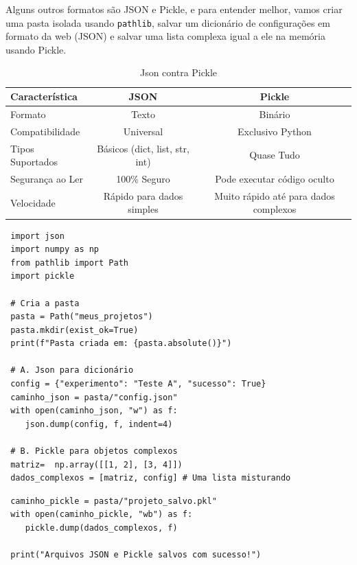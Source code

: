 \documentclass[../numerical_methods.tex]{subfiles}
\begin{document}
Alguns outros formatos são JSON e Pickle, e para entender melhor, vamos criar uma pasta isolada usando \texttt{pathlib}, salvar um dicionário de configurações em formato da web (JSON) e salvar uma lista complexa igual a ele na memória usando Pickle.
\begin{center}
	\begin{table}[H]
		\centering
		\begin{tabular}{l c c}
			\hline
			Característica   & JSON                           & Pickle                                \\
			\hline
			Formato          & Texto                          & Binário                               \\
			Compatibilidade  & Universal                      & Exclusivo Python                      \\
			Tipos Suportados & Básicos (dict, list, str, int) & Quase Tudo                            \\
			Segurança ao Ler & 100\% Seguro                   & Pode executar código oculto           \\
			Velocidade       & Rápido para dados simples      & Muito rápido até para dados complexos \\
			\hline
		\end{tabular}
		\caption{Json contra Pickle}
	\end{table}
\end{center}
\begin{listing}[H]
	\begin{verbatim}
 import json 
 import numpy as np 
 from pathlib import Path 
 import pickle 

 # Cria a pasta 
 pasta = Path("meus_projetos")
 pasta.mkdir(exist_ok=True)
 print(f"Pasta criada em: {pasta.absolute()}")

 # A. Json para dicionário 
 config = {"experimento": "Teste A", "sucesso": True}
 caminho_json = pasta/"config.json"
 with open(caminho_json, "w") as f: 
    json.dump(config, f, indent=4)

 # B. Pickle para objetos complexos 
 matriz=  np.array([[1, 2], [3, 4]])
 dados_complexos = [matriz, config] # Uma lista misturando 
\end{verbatim}
\end{listing}

\begin{listing}[H]
	\begin{verbatim}
 caminho_pickle = pasta/"projeto_salvo.pkl"
 with open(caminho_pickle, "wb") as f:
    pickle.dump(dados_complexos, f)

 print("Arquivos JSON e Pickle salvos com sucesso!")
 \end{verbatim}
\end{listing}
\end{document}
